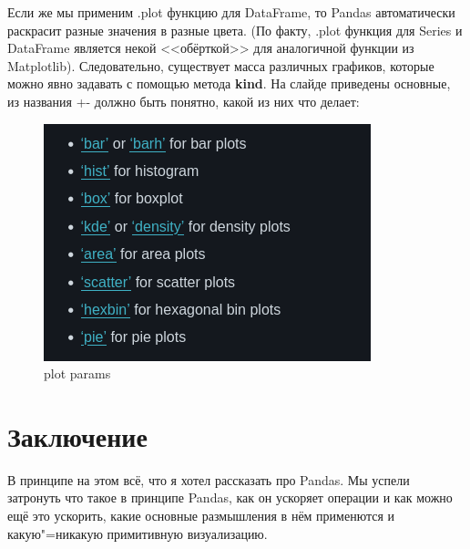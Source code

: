 \documentclass{article}
\begin{document}
Если же мы применим .plot функцию для DataFrame, то Pandas автоматически раскрасит разные значения в разные цвета. (По факту, .plot функция для Series и DataFrame является некой <<обёрткой>> для аналогичной функции из Matplotlib). Следовательно, существует масса различных графиков, которые можно явно задавать с помощью метода \textbf{kind}. На слайде приведены основные, из названия +- должно быть понятно, какой из них что делает:
\begin{figure}[H]
    \centering
    \includegraphics[width=0.75\linewidth]{image.png}
    \caption{plot params}
    \label{fig:enter-label}
\end{figure}

\section*{Заключение}
В принципе на этом всё, что я хотел рассказать про Pandas. Мы успели затронуть что такое в принципе Pandas, как он ускоряет операции и как можно ещё это ускорить, какие основные размышления в нём применются и какую"=никакую примитивную визуализацию.
\end{document}

